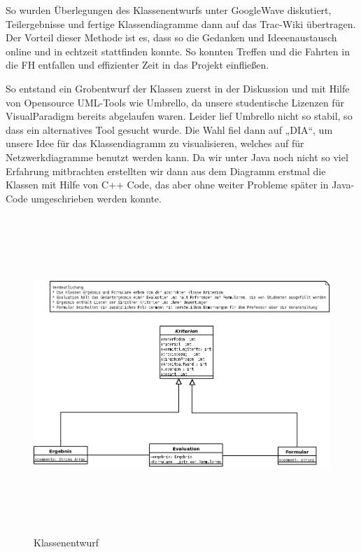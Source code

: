 \documentclass[titlepage, 12pt,a4paper]{scrartcl}
\begin{document}
So wurden Überlegungen des Klassenentwurfs unter GoogleWave diskutiert,
Teilergebnisse und fertige Klassendiagramme dann auf das Trac-Wiki
übertragen. Der Vorteil dieser Methode ist es, dass so die Gedanken und
Ideeenaustausch online und in echtzeit stattfinden konnte. So konnten Treffen
und die Fahrten in die FH entfallen und effizienter Zeit in das Projekt
einfließen.

So entstand ein Grobentwurf der Klassen zuerst in der Diskussion und mit Hilfe
von Opensource UML-Tools wie Umbrello, da unsere studentische Lizenzen für
VisualParadigm bereits abgelaufen waren. Leider lief Umbrello nicht so stabil,
so dass ein alternatives Tool gesucht wurde. Die Wahl fiel dann auf „DIA“, um
unsere Idee für das Klassendiagramm zu visualisieren, welches auf für
Netzwerkdiagramme benutzt werden kann. Da wir unter Java noch nicht so viel
Erfahrung mitbrachten erstellten wir dann aus dem Diagramm erstmal die Klassen
mit Hilfe von C++ Code, das aber ohne weiter Probleme später in Java-Code
umgeschrieben werden konnte.

\begin{figure}[h]
\begin{center}
\includegraphics[width=15cm, height=12cm]{bilder/LehrEvaluation.png}
\caption{Klassenentwurf}
\label{Klassen}
\end{center}
\end{figure}
\end{document}
